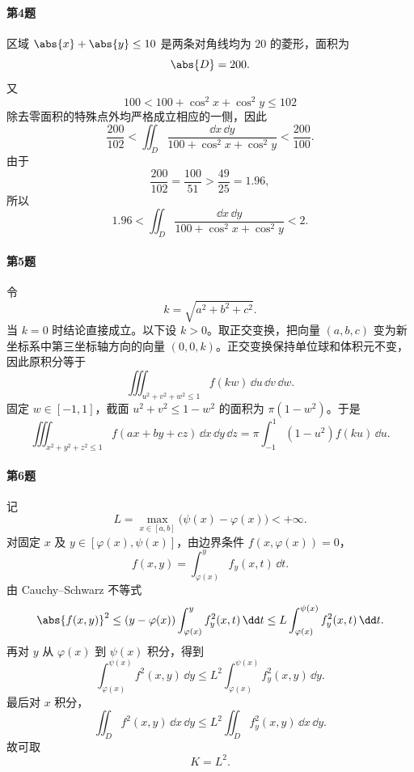 \paragraph{第4题}
\begin{xsolution}
区域 $\abs{x}+\abs{y}\le10$ 是两条对角线均为 $20$ 的菱形，面积为
\[
  \abs{D}=200.
\]
又
\[
  100<100+\cos^2x+\cos^2y\le102
\]
除去零面积的特殊点外均严格成立相应的一侧，因此
\[
  \frac{200}{102}<
  \iint_D\frac{\dd x\,\dd y}{100+\cos^2x+\cos^2y}
  <\frac{200}{100}.
\]
由于
\[
  \frac{200}{102}=\frac{100}{51}>\frac{49}{25}=1.96,
\]
所以
\[
  \boxed{1.96<\iint_D\frac{\dd x\,\dd y}{100+\cos^2x+\cos^2y}<2}.
\]
\end{xsolution}

\paragraph{第5题}
\begin{xsolution}
令
\[
  k=\sqrt{a^2+b^2+c^2}.
\]
当 $k=0$ 时结论直接成立。以下设 $k>0$。取正交变换，把向量 $(a,b,c)$ 变为新坐标系中第三坐标轴方向的向量 $(0,0,k)$。正交变换保持单位球和体积元不变，因此原积分等于
\[
  \iiint_{u^2+v^2+w^2\le1}f(kw)\,\dd u\,\dd v\,\dd w.
\]
固定 $w\in[-1,1]$，截面 $u^2+v^2\le1-w^2$ 的面积为 $\pi(1-w^2)$。于是
\[
  \boxed{
  \iiint_{x^2+y^2+z^2\le1}f(ax+by+cz)\,\dd x\,\dd y\,\dd z
  =\pi\int_{-1}^1(1-u^2)f(ku)\,\dd u }.
\]
\end{xsolution}

\paragraph{第6题}
\begin{xsolution}
记
\[
  L=\max_{x\in[a,b]}\bigl(\psi(x)-\varphi(x)\bigr)<+\infty.
\]
对固定 $x$ 及 $y\in[\varphi(x),\psi(x)]$，由边界条件 $f(x,\varphi(x))=0$，
\[
  f(x,y)=\int_{\varphi(x)}^y f_y(x,t)\,\dd t.
\]
由 Cauchy--Schwarz 不等式
\[
  \abs{f(x,y)}^2
  \le(y-\varphi(x))
  \int_{\varphi(x)}^y f_y^2(x,t)\,\dd t
  \le L\int_{\varphi(x)}^{\psi(x)}f_y^2(x,t)\,\dd t.
\]
再对 $y$ 从 $\varphi(x)$ 到 $\psi(x)$ 积分，得到
\[
  \int_{\varphi(x)}^{\psi(x)}f^2(x,y)\,\dd y
  \le L^2\int_{\varphi(x)}^{\psi(x)}f_y^2(x,y)\,\dd y.
\]
最后对 $x$ 积分，
\[
  \iint_D f^2(x,y)\,\dd x\,\dd y
  \le L^2\iint_D f_y^2(x,y)\,\dd x\,\dd y.
\]
故可取
\[
  \boxed{K=L^2}.
\]
\end{xsolution}

